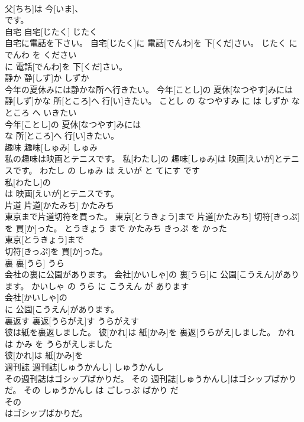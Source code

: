 \documentclass[8pt]{extreport}
\begin{document}
\begin{CJK}{UTF8}{min}
\\	父[ちち]は 今[いま]、
\\	です。			
\\	自宅	自宅[じたく]	じたく	
\\	自宅に電話を下さい。	自宅[じたく]に 電話[でんわ]を 下[くだ]さい。	じたく に でんわ を ください	
\\	に 電話[でんわ]を 下[くだ]さい。			
\\	静か	静[しず]か	しずか	
\\	今年の夏休みには静かな所へ行きたい。	今年[ことし]の 夏休[なつやす]みには 静[しず]かな 所[ところ]へ 行[い]きたい。	ことし の なつやすみ に は しずか な ところ へ いきたい	
\\	今年[ことし]の 夏休[なつやす]みには
\\	な 所[ところ]へ 行[い]きたい。			
\\	趣味	趣味[しゅみ]	しゅみ	
\\	私の趣味は映画とテニスです。	私[わたし]の 趣味[しゅみ]は 映画[えいが]とテニスです。	わたし の しゅみ は えいが と てにす です	
\\	私[わたし]の
\\	は 映画[えいが]とテニスです。			
\\	片道	片道[かたみち]	かたみち	
\\	東京まで片道切符を買った。	東京[とうきょう]まで 片道[かたみち] 切符[きっぷ]を 買[か]った。	とうきょう まで かたみち きっぷ を かった	
\\	東京[とうきょう]まで
\\	切符[きっぷ]を 買[か]った。			
\\	裏	裏[うら]	うら	
\\	会社の裏に公園があります。	会社[かいしゃ]の 裏[うら]に 公園[こうえん]があります。	かいしゃ の うら に こうえん が あります	
\\	会社[かいしゃ]の
\\	に 公園[こうえん]があります。			
\\	裏返す	裏返[うらがえ]す	うらがえす	
\\	彼は紙を裏返しました。	彼[かれ]は 紙[かみ]を 裏返[うらがえ]しました。	かれ は かみ を うらがえしました	
\\	彼[かれ]は 紙[かみ]を
\\	週刊誌	週刊誌[しゅうかんし]	しゅうかんし	
\\	その週刊誌はゴシップばかりだ。	その 週刊誌[しゅうかんし]はゴシップばかりだ。	その しゅうかんし は ごしっぷ ばかり だ	
\\	その
\\	はゴシップばかりだ。			

\end{CJK}
\end{document}
